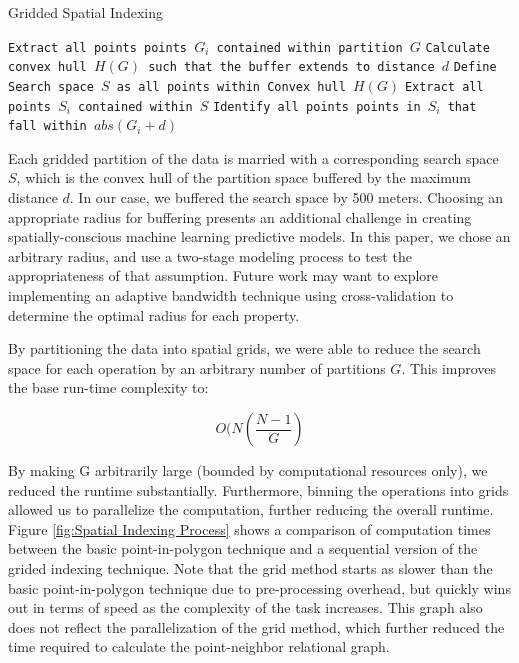 \documentclass[conference,final,]{IEEEtran}
\begin{document}
\begin{algorithm}
\caption{Gridded Spatial Indexing}
\label{alg:spatial1}
\begin{algorithmic}[1]
\State \texttt{Extract all points points $G_i$ contained within partition $G$}
\State \texttt{Calculate convex hull $H(G)$ such that the buffer extends to distance $d$}
\State \texttt{Define Search space $S$ as all points within Convex hull $H(G)$}
\State \texttt{Extract all points $S_i$ contained within $S$}
\State \texttt{Identify all points points in $S_i$ that fall within $abs(G_i+d)$}
\EndFor
\EndFor
\end{algorithmic}
\end{algorithm}

Each gridded partition of the data is married with a corresponding
search space \(S\), which is the convex hull of the partition space
buffered by the maximum distance \(d\). In our case, we buffered the
search space by 500 meters. Choosing an appropriate radius for buffering
presents an additional challenge in creating spatially-conscious machine
learning predictive models. In this paper, we chose an arbitrary radius,
and use a two-stage modeling process to test the appropriateness of that
assumption. Future work may want to explore implementing an adaptive
bandwidth technique using cross-validation to determine the optimal
radius for each property.

By partitioning the data into spatial grids, we were able to reduce the
search space for each operation by an arbitrary number of partitions
\(G\). This improves the base run-time complexity to:

\[
O(N(\frac{N-1}{G})
\]

\noindent By making G arbitrarily large (bounded by computational
resources only), we reduced the runtime substantially. Furthermore,
binning the operations into grids allowed us to parallelize the
computation, further reducing the overall runtime. Figure
\ref{fig:Spatial Indexing Process} shows a comparison of computation
times between the basic point-in-polygon technique and a sequential
version of the grided indexing technique. Note that the grid method
starts as slower than the basic point-in-polygon technique due to
pre-processing overhead, but quickly wins out in terms of speed as the
complexity of the task increases. This graph also does not reflect the
parallelization of the grid method, which further reduced the time
required to calculate the point-neighbor relational graph.
\end{document}
